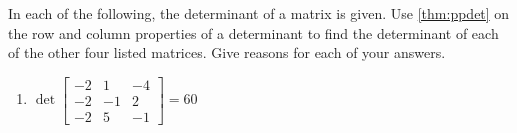 \begin{exercise}  
In each of the following, the determinant of a matrix is given. 
Use \cref{thm:ppdet} on the row and column properties of a determinant to find the determinant of each of the other four listed matrices.
Give reasons for each of your answers.
\begin{enumerate}
\item \(\det\begin{bmatrix} -2 & 1 & -4
\\-2 & -1 & 2
\\-2 & 5 & -1 \end{bmatrix}=60\)



\end{enumerate}
\end{exercise}
